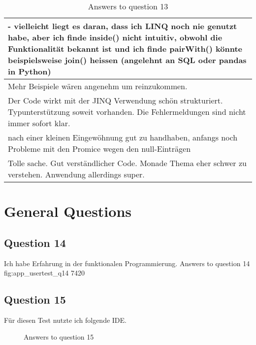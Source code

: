 \begin{table}[H]
\begin{tabularx}{\textwidth}{| X |}
    - vielleicht liegt es daran, dass ich LINQ noch nie genutzt habe, aber ich finde inside() nicht intuitiv, obwohl die Funktionalität bekannt ist und ich finde pairWith() könnte beispielsweise join() heissen (angelehnt an SQL oder pandas in Python) \\ \hline 
    Mehr Beispiele wären angenehm um reinzukommen. \\ \hline 
    Der Code wirkt mit der JINQ Verwendung schön strukturiert. Typunterstützung soweit vorhanden. Die Fehlermeldungen sind nicht immer sofort klar. \\ \hline 
    nach einer kleinen Eingewöhnung gut zu handhaben, anfangs noch Probleme mit den Promice wegen den null-Einträgen \\ \hline 
    Tolle sache. Gut verständlicher Code. Monade Thema eher schwer zu verstehen. Anwendung allerdings super. \\ \hline 
  \end{tabularx}
  \caption{Answers to question 13}
  \label{tab:app_usertest_q13}
\end{table}

\section{General Questions} %
\label{sec:General Questions}

\subsection*{Question 14}
\label{sub:ut_q14}
Ich habe Erfahrung in der funktionalen Programmierung.
\likertbarchart
  {Answers to question 14}
  {fig:app_usertest_q14}
  {7}{4}{2}{0}
  
\subsection*{Question 15}
\label{sub:ut_q15}
Für diesen Test nutzte ich folgende IDE.
\begin{figure}[H]
  \centering
  \caption{Answers to question 15}
  \label{fig:app_usertest_q15}
\end{figure}
